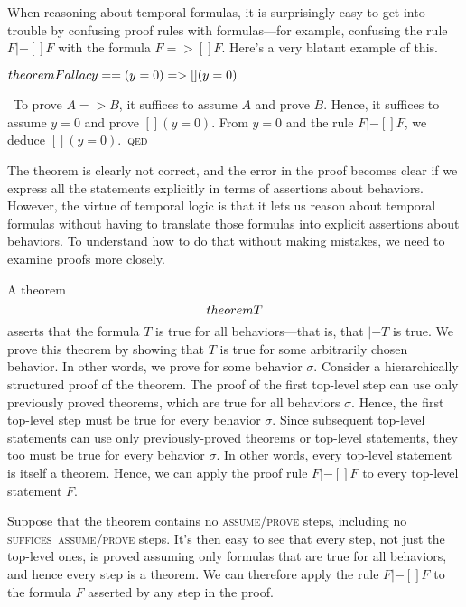 \documentclass[fleqn,leqno]{article}
\begin{document}
When reasoning about temporal formulas, it is surprisingly easy to get
into trouble by confusing proof rules with formulas---for example,
confusing the rule $F|-[]F$ with the formula $F=>[]F$.  Here's a very
blatant example of this.
\begin{display}
$\THEOREM Fallacy == (y=0) => [](y=0)$

\smallskip
\pf\ To prove $A=>B$, it suffices to assume $A$ and prove $B$.  Hence,
it suffices to assume $y=0$ and prove $[](y=0)$.  From $y=0$ and
the rule $F|-[]F$, we deduce $[](y=0)$.~\textsc{qed}
\end{display}
The theorem is clearly not correct, and the error in the proof becomes
clear if we express all the statements explicitly in terms of
assertions about behaviors.  However, the virtue of temporal logic is
that it lets us reason about temporal formulas without having to
translate those formulas into explicit assertions about behaviors.  To
understand how to do that without making mistakes, we need to examine
proofs more closely.

A theorem 
 \[ \THEOREM T \]
asserts that the formula $T$ is true for all behaviors---that is, that
$|-T$ is true.  We prove this theorem by showing that $T$ is true for
some arbitrarily chosen behavior.  In other words, we prove
 for some behavior $\sigma$.  Consider a hierarchically
structured proof of the theorem.  The proof of the first top-level
step can use only previously proved theorems, which are true for all
behaviors $\sigma$.  Hence, the first top-level step must be true for
every behavior $\sigma$.  Since subsequent top-level statements can
use only previously-proved theorems or top-level statements, they too
must be true for every behavior $\sigma$.  In other words, every
top-level statement is itself a theorem.  Hence, we can apply the
proof rule $F |- []F$ to every top-level statement $F$.

Suppose that the theorem contains no \textsc{assume}/\textsc{prove}
steps, including no \textsc{suffices}~\textsc{assume}/\textsc{prove}
steps.  It's then easy to see that every step, not just the top-level
ones, is proved assuming only formulas that are true for all
behaviors, and hence every step is a theorem.  We can therefore
apply the rule $F |- []F$ to the formula $F$ asserted by any step
in the proof.
\end{document}

